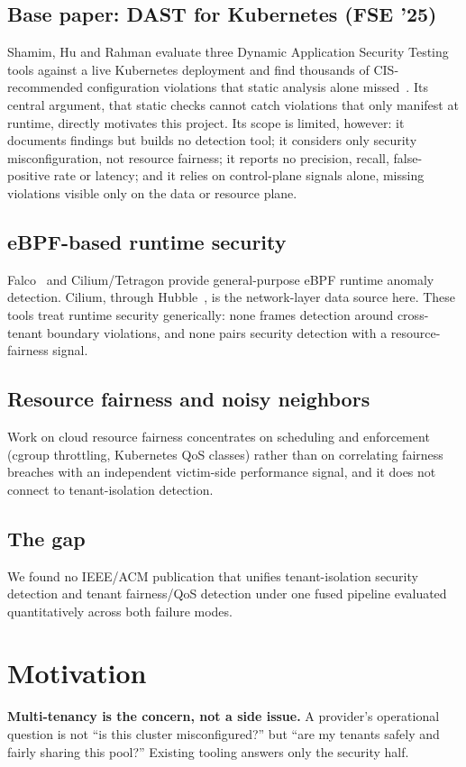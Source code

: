 \documentclass[conference]{IEEEtran}
\begin{document}
\subsection{Base paper: DAST for Kubernetes (FSE '25)}
Shamim, Hu and Rahman evaluate three Dynamic Application Security Testing tools against a live Kubernetes deployment and find thousands of CIS-recommended configuration violations that static analysis alone missed~\cite{shamim2025}. Its central argument, that static checks cannot catch violations that only manifest at runtime, directly motivates this project. Its scope is limited, however: it documents findings but builds no detection tool; it considers only security misconfiguration, not resource fairness; it reports no precision, recall, false-positive rate or latency; and it relies on control-plane signals alone, missing violations visible only on the data or resource plane.

\subsection{eBPF-based runtime security}
Falco~\cite{falco} and Cilium/Tetragon provide general-purpose eBPF runtime anomaly detection. Cilium, through Hubble~\cite{hubble}, is the network-layer data source here. These tools treat runtime security generically: none frames detection around cross-tenant boundary violations, and none pairs security detection with a resource-fairness signal.

\subsection{Resource fairness and noisy neighbors}
Work on cloud resource fairness concentrates on scheduling and enforcement (cgroup throttling, Kubernetes QoS classes) rather than on correlating fairness breaches with an independent victim-side performance signal, and it does not connect to tenant-isolation detection.

\subsection{The gap}
We found no IEEE/ACM publication that unifies tenant-isolation security detection and tenant fairness/QoS detection under one fused pipeline evaluated quantitatively across both failure modes.

\section{Motivation}
\textbf{Multi-tenancy is the concern, not a side issue.} A provider's operational question is not ``is this cluster misconfigured?'' but ``are my tenants safely and fairly sharing this pool?'' Existing tooling answers only the security half.
\end{document}
